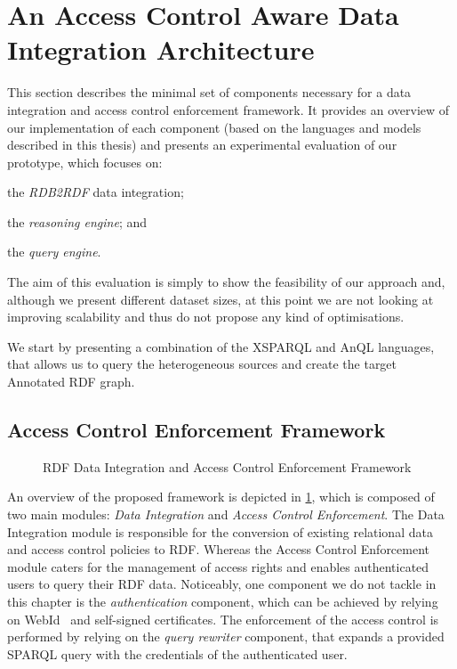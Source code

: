 
\section{An Access Control Aware Data Integration Architecture}
\label{sec:prototype}



This section describes the minimal set of components necessary for a data integration and access control enforcement
framework.  It provides an overview of our implementation of each component (based on the languages and models described
in this thesis) and presents an experimental evaluation of our prototype, which focuses on:
%
\begin{inparaenum}[(i)]
\item the \emph{RDB2RDF} data integration;
\item the \emph{reasoning engine}; and
\item the \emph{query engine}.
\end{inparaenum}
%
The aim of this evaluation is simply to show the feasibility of our approach and, although we present different dataset
sizes, at this point we are not looking at improving scalability and thus do not propose any kind of optimisations.
%

We start by presenting a combination of the XSPARQL and AnQL languages, that allows us to query the heterogeneous
sources and create the target Annotated RDF graph.





\subsection{Access Control Enforcement Framework}
\label{sec:fram-descr}

%
\begin{figure}[t]
  \centering
  
  \caption{RDF Data Integration and Access Control Enforcement Framework}
  \label{fig:systemOverview}
\end{figure}
%
An overview of the proposed framework is depicted in \cref{fig:systemOverview}, which is composed of two main modules:
\emph{Data Integration} and \emph{Access Control Enforcement}.
%
The Data Integration module is responsible for the conversion of existing relational data and access control policies to
\ac{RDF}. Whereas the Access Control Enforcement module caters for the management of access rights and enables
authenticated users to query their \ac{RDF} data.
%
Noticeably, one component we do not tackle in this chapter is the \emph{authentication} component, which can be achieved
by relying on WebId~\cite{SpornyInksterStory:2011aa} and self-signed certificates.
%
The enforcement of the access control is performed by relying on the \emph{query rewriter} component, that expands a
provided SPARQL query with the credentials of the authenticated user.

